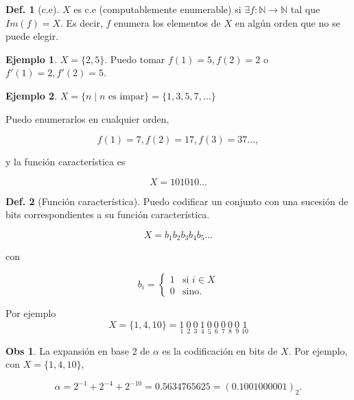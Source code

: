 \documentclass{article}
\theoremstyle{definition} %
\newtheorem{definition}{Def.}
\newtheorem*{observation*}{Obs}
\newtheorem{example}{Ejemplo}
\begin{document}
\begin{definition}[c.e]
    $X$ es c.e (computablemente enumerable) si $\exists f: \mathbb{N} \to
    \mathbb{N}$ tal que $Im(f) = X$. Es decir, $f$ enumera los elementos de $X$
    en algún orden que no se puede elegir.
    \begin{example}
        $X = \{2, 5\}$. Puedo tomar $f(1) = 5, f(2) = 2$ o $f'(1) = 2, f'(2) = 5$.
    \end{example}
    \begin{example}
        $X = \{ n \mid n \text{ es impar} \} = \{1, 3, 5, 7, \dots \}$

        Puedo enumerarlos en cualquier orden,
        
        $$f(1) = 7, f(2) = 17, f(3) = 37\dots,$$
        
        y la función característica es

        $$X = 101010 \dots$$
    \end{example}
\end{definition}
\begin{definition}[Función característica]
    Puedo codificar un conjunto con una sucesión de bits correspondientes a su
    función característica.

    \[
        X = b_1 b_2 b_3 b_4 b_5 \dots
    \]

    con

    \[
        b_i =
            \begin{cases}
                1 & \text{si } i \in X \\
                0 & \text{sino.}
            \end{cases}
    \]

    Por ejemplo
    \[
        X = \{1, 4, 10\}
        =
        \underset{1}{1}\
        \underset{2}{0}\
        \underset{3}{0}\
        \underset{4}{1}\
        \underset{5}{0}\
        \underset{6}{0}\
        \underset{7}{0}\
        \underset{8}{0}\
        \underset{9}{0}\
        \underset{10}{1}
    \]
\end{definition}
\begin{observation*}
    La expansión en base 2 de $\alpha$ es la codificación en bits de $X$. Por ejemplo, con $X = \{1, 4,
    10\}$,

    $$\alpha = 2^{-1} + 2^{-4} + 2^{-10} = 0.5634765625 = (0.1001000001)_2.$$
\end{observation*}
\end{document}
